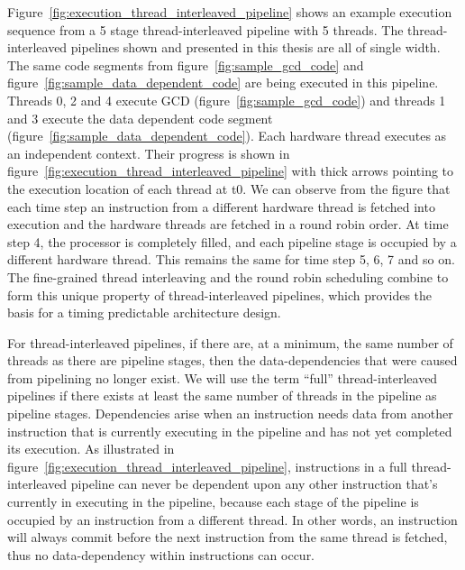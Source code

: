 Figure~\ref{fig:execution_thread_interleaved_pipeline} shows an example execution sequence from a 5 stage thread-interleaved pipeline with 5 threads.
The thread-interleaved pipelines shown and presented in this thesis are all of single width.
The same code segments from figure~\ref{fig:sample_gcd_code} and figure~\ref{fig:sample_data_dependent_code} are being executed in this pipeline. 
Threads 0, 2 and 4 execute GCD (figure~\ref{fig:sample_gcd_code}) and threads 1 and 3 execute the data dependent code segment (figure~\ref{fig:sample_data_dependent_code}).
Each hardware thread executes as an independent context.
Their progress is shown in figure~\ref{fig:execution_thread_interleaved_pipeline} with thick arrows pointing to the execution location of each thread at t0.    
We can observe from the figure that each time step an instruction from a different hardware thread is fetched into execution and the hardware threads are fetched in a round robin order.
At time step 4, the processor is completely filled, and each pipeline stage is occupied by a different hardware thread.
This remains the same for time step 5, 6, 7 and so on. 
The fine-grained thread interleaving and the round robin scheduling combine to form this unique property of thread-interleaved pipelines, which provides the basis for a timing predictable architecture design.

For thread-interleaved pipelines, if there are, at a minimum, the same number of threads as there are pipeline stages, then the data-dependencies that were caused from pipelining no longer exist. 
We will use the term ``full'' thread-interleaved pipelines if there exists at least the same number of threads in the pipeline as pipeline stages.  
Dependencies arise when an instruction needs data from another instruction that is currently executing in the pipeline and has not yet completed its execution.
As illustrated in figure~\ref{fig:execution_thread_interleaved_pipeline}, instructions in a full thread-interleaved pipeline can never be dependent upon any other instruction that's currently in executing in the pipeline, because each stage of the pipeline is occupied by an instruction from a different thread.
In other words, an instruction will always commit before the next instruction from the same thread is fetched, thus no data-dependency within instructions can occur. 


